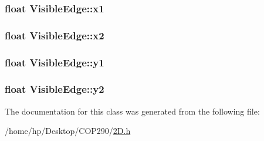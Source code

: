 \subsubsection[{\texorpdfstring{x1}{x1}}]{\setlength{\rightskip}{0pt plus 5cm}float Visible\+Edge\+::x1}\hypertarget{class_visible_edge_a7baae9b2413ae1375d49ff023f272ad3}{}\label{class_visible_edge_a7baae9b2413ae1375d49ff023f272ad3}
\subsubsection[{\texorpdfstring{x2}{x2}}]{\setlength{\rightskip}{0pt plus 5cm}float Visible\+Edge\+::x2}\hypertarget{class_visible_edge_a6524c696bcd4e189dd393832e95bde4c}{}\label{class_visible_edge_a6524c696bcd4e189dd393832e95bde4c}
\subsubsection[{\texorpdfstring{y1}{y1}}]{\setlength{\rightskip}{0pt plus 5cm}float Visible\+Edge\+::y1}\hypertarget{class_visible_edge_ad371a067b7175df3ee9a7672a0f36986}{}\label{class_visible_edge_ad371a067b7175df3ee9a7672a0f36986}
\subsubsection[{\texorpdfstring{y2}{y2}}]{\setlength{\rightskip}{0pt plus 5cm}float Visible\+Edge\+::y2}\hypertarget{class_visible_edge_a0e125191d1f182de18ce9dfb35a98d68}{}\label{class_visible_edge_a0e125191d1f182de18ce9dfb35a98d68}


The documentation for this class was generated from the following file\+:\begin{DoxyCompactItemize}
\item 
/home/hp/\+Desktop/\+C\+O\+P290/\hyperlink{2_d_8h}{2\+D.\+h}\end{DoxyCompactItemize}
